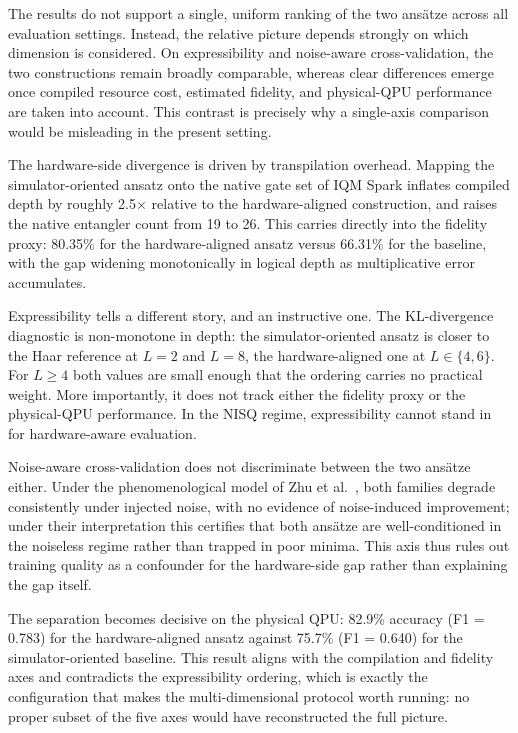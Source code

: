 \documentclass[11pt]{article}
\begin{document}
The results do not support a single, uniform ranking of the two ansätze across all evaluation settings. Instead, the relative picture depends strongly on which dimension is considered. On expressibility and noise-aware cross-validation, the two constructions remain broadly comparable, whereas clear differences emerge once compiled resource cost, estimated fidelity, and physical-QPU performance are taken into account. This contrast is precisely why a single-axis comparison would be misleading in the present setting.

The hardware-side divergence is driven by transpilation overhead. Mapping the simulator-oriented ansatz onto the native gate set of IQM Spark inflates compiled depth by roughly 2.5$\times$ relative to the hardware-aligned construction, and raises the native entangler count from 19 to 26. This carries directly into the fidelity proxy: 80.35\% for the hardware-aligned ansatz versus 66.31\% for the baseline, with the gap widening monotonically in logical depth as multiplicative error accumulates.

Expressibility tells a different story, and an instructive one. The KL-divergence diagnostic is non-monotone in depth: the simulator-oriented ansatz is closer to the Haar reference at $L=2$ and $L=8$, the hardware-aligned one at $L \in \{4, 6\}$. For $L \geq 4$ both values are small enough that the ordering carries no practical weight. More importantly, it does not track either the fidelity proxy or the physical-QPU performance. In the NISQ regime, expressibility cannot stand in for hardware-aware evaluation.

Noise-aware cross-validation does not discriminate between the two ansätze either. Under the phenomenological model of Zhu et al.~\cite{zhu2026}, both families degrade consistently under injected noise, with no evidence of noise-induced improvement; under their interpretation this certifies that both ansätze are well-conditioned in the noiseless regime rather than trapped in poor minima. This axis thus rules out training quality as a confounder for the hardware-side gap rather than explaining the gap itself.

The separation becomes decisive on the physical QPU: 82.9\% accuracy (F1 = 0.783) for the hardware-aligned ansatz against 75.7\% (F1 = 0.640) for the simulator-oriented baseline. This result aligns with the compilation and fidelity axes and contradicts the expressibility ordering, which is exactly the configuration that makes the multi-dimensional protocol worth running: no proper subset of the five axes would have reconstructed the full picture.
\end{document}

